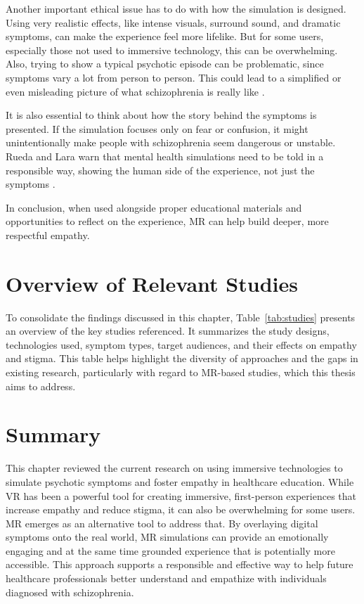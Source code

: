 \vspace{1em}

Another important ethical issue has to do with how the simulation is designed. Using very realistic effects, like intense visuals, surround sound, and dramatic symptoms, can make the experience feel more lifelike. But for some users, especially those not used to immersive technology, this can be overwhelming. Also, trying to show a typical psychotic episode can be problematic, since symptoms vary a lot from person to person. This could lead to a simplified or even misleading picture of what schizophrenia is really like \cite{Zare-Bidaki2022}.

\vspace{1em}

It is also essential to think about how the story behind the symptoms is presented. If the simulation focuses only on fear or confusion, it might unintentionally make people with schizophrenia seem dangerous or unstable. Rueda and Lara warn that mental health simulations need to be told in a responsible way, showing the human side of the experience, not just the symptoms \cite{Rueda2020}.

\vspace{1em}

In conclusion, when used alongside proper educational materials and opportunities to reflect on the experience, MR can help build deeper, more respectful empathy. 

\section{Overview of Relevant Studies}
To consolidate the findings discussed in this chapter, Table~\ref{tab:studies} presents an overview of the key studies referenced. It summarizes the study designs, technologies used, symptom types, target audiences, and their effects on empathy and stigma. This table helps highlight the diversity of approaches and the gaps in existing research, particularly with regard to MR-based studies, which this thesis aims to address.

\section{Summary}
This chapter reviewed the current research on using immersive technologies to simulate psychotic symptoms and foster empathy in healthcare education. While VR has been a powerful tool for creating immersive, first-person experiences that increase empathy and reduce stigma, it can also be overwhelming for some users. MR emerges as an alternative tool to address that. By overlaying digital symptoms onto the real world, MR simulations can provide an emotionally engaging and at the same time grounded experience that is potentially more accessible. This approach supports a responsible and effective way to help future healthcare professionals better understand and empathize with individuals diagnosed with schizophrenia.

